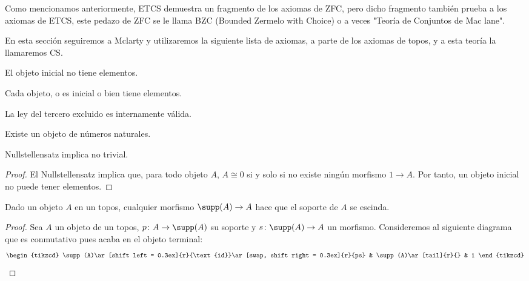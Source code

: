 Como mencionamos anteriormente, ETCS demuestra un fragmento de los axiomas de ZFC, pero dicho fragmento también prueba a los axiomas de ETCS,
este pedazo de ZFC se le llama BZC (Bounded Zermelo with Choice) o a veces "Teoría de Conjuntos de Mac lane".

En esta sección seguiremos a Mclarty \cite{mclarty1988defining} y utilizaremos la siguiente lista de axiomas,
a parte de los axiomas de topos, y a esta teoría la llamaremos CS.

\begin{axiom}[No trivial]
    El objeto inicial no tiene elementos.
\end{axiom}

\begin{axiom}[Nullstellensatz]
    Cada objeto, o es inicial o bien tiene elementos.
\end{axiom}

\begin{axiom}[Booleano]
    La ley del tercero excluido es internamente válida.
\end{axiom}

\begin{axiom}[Infinito]
    Existe un objeto de números naturales.
\end{axiom}

\begin{proposition}
    Nullstellensatz implica no trivial.
\end{proposition}
\begin{proof}
    El Nullstellensatz implica que, para todo objeto $A$, $A\cong 0$ si y solo si
    no existe ningún morfismo $1\to A$. Por tanto, un objeto inicial no puede tener elementos.
\end{proof}

\begin{proposition}
    Dado un objeto $A$ en un topos, cualquier morfismo $\supp(A)\to A$ hace que el soporte de $A$ se escinda.
\end{proposition}
\begin{proof}
    Sea $A$ un objeto de un topos, $p\colon A\to \supp(A)$ su soporte y $s\colon \supp(A)\to A$ un morfismo. 
    Consideremos al siguiente diagrama que es conmutativo pues acaba en el objeto terminal:
    \begin{equation*}
        \begin{tikzcd}
            \supp(A)\ar[shift left = 0.3ex]{r}{\text{id}}\ar[swap, shift right = 0.3ex]{r}{ps} & \supp(A)\ar[tail]{r}{} & 1
        \end{tikzcd}
    \end{equation*}
\end{proof}

